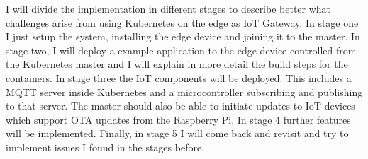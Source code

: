 I will divide the implementation in different stages to describe better what challenges arise from using Kubernetes on the edge as IoT Gateway. In stage one I just setup the system, installing the edge device and joining it to the master. In stage two, I will deploy a example application to the edge device controlled from the Kubernetes master and I will explain in more detail the build steps for the containers. In stage three the IoT components will be deployed. This includes a MQTT server inside Kubernetes and a microcontroller subscribing and publishing to that server. The master should also be able to initiate updates to IoT devices which support OTA updates from the Raspberry Pi. In stage 4 further features will be implemented. Finally, in stage 5 I will come back and revisit and try to implement issues I found in the stages before.\\










